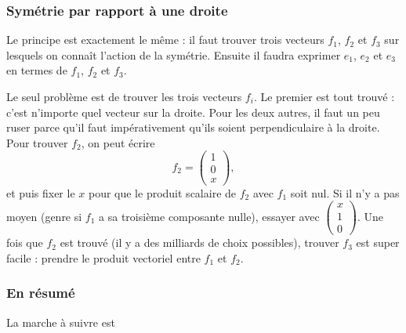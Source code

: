 \subsubsection{Symétrie par rapport à une droite}

Le principe est exactement le même : il faut trouver trois vecteurs \( f_1\), \( f_2\) et \( f_3\) sur lesquels on connaît l'action de la symétrie. Ensuite il faudra exprimer \( e_1\), \( e_2\) et \( e_3\) en termes de \( f_1\), \( f_2\) et \( f_3\).

Le seul problème est de trouver les trois vecteurs \( f_i\). Le premier est tout trouvé : c'est n'importe quel vecteur sur la droite. Pour les deux autres, il faut un peu ruser parce qu'il faut impérativement qu'ils soient perpendiculaire à la droite. Pour trouver \( f_2\), on peut écrire
\begin{equation}
	f_2=\begin{pmatrix}
		1 \\
		0 \\
		x
	\end{pmatrix},
\end{equation}
et puis fixer le \( x\) pour que le produit scalaire de \( f_2\) avec \( f_1\) soit nul. Si il n'y a pas moyen (genre si \( f_1\) a sa troisième composante nulle), essayer avec \( \begin{pmatrix}
		x \\
		1 \\
		0
	\end{pmatrix}\). Une fois que \( f_2\) est trouvé (il y a des milliards de choix possibles), trouver \( f_3\) est super facile : prendre le produit vectoriel entre \( f_1\) et \( f_2\).

\subsubsection{En résumé}
La marche à suivre est

